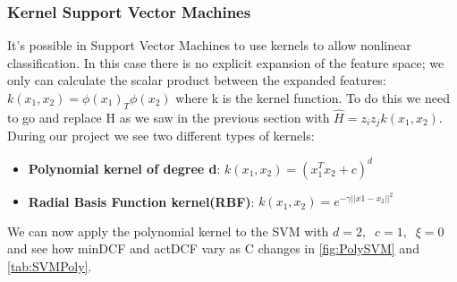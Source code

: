 \newpage

\subsubsection{Kernel Support Vector Machines}
It's possible in Support Vector Machines to use kernels to allow nonlinear classification.
In this case there is no explicit expansion of the feature space;
we only can calculate the scalar product between the expanded features:\( k(x_1,x_2)=\phi(x_1)_T\phi(x_2)\) where k is the kernel function.
To do this we need to go and replace H as we saw in the previous section with \(\hat{H}= z_iz_jk(x_1,x_2)\).
During our project we see two different types of kernels:
\begin{itemize}
    \item \textbf{Polynomial kernel of degree d}: \(k(x_1,x_2)=(x_1^Tx_2+c)^d\)
    \item \textbf{Radial Basis Function kernel(RBF)}: \(k(x_1,x_2)=e^{-\gamma||x1-x_2||^2}\)
\end{itemize}
We can now apply the polynomial kernel to the SVM with \(d=2,\;\; c=1, \;\;\xi=0\) and see how minDCF and actDCF vary as C changes
in \autoref{fig:PolySVM} and \autoref{tab:SVMPoly}.

